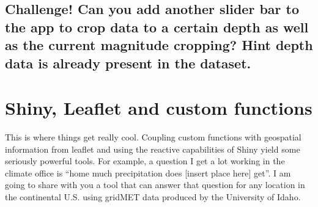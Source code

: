 \documentclass[]{article}
\newenvironment{Shaded}{\begin{snugshade}}{\end{snugshade}}
\newcommand{\DataTypeTok}[1]{\textcolor[rgb]{0.13,0.29,0.53}{#1}}
\newcommand{\FloatTok}[1]{\textcolor[rgb]{0.00,0.00,0.81}{#1}}
\newcommand{\KeywordTok}[1]{\textcolor[rgb]{0.13,0.29,0.53}{\textbf{#1}}}
\newcommand{\NormalTok}[1]{#1}
\newcommand{\OperatorTok}[1]{\textcolor[rgb]{0.81,0.36,0.00}{\textbf{#1}}}
\newcommand{\StringTok}[1]{\textcolor[rgb]{0.31,0.60,0.02}{#1}}
\begin{document}
\begin{Shaded}
\begin{Highlighting}[]
{{{{\StringTok{        }\KeywordTok{addLegend}\NormalTok{(}\DataTypeTok{position=}\StringTok{"bottomleft"}\NormalTok{, }\DataTypeTok{pal=}\NormalTok{pal, }\DataTypeTok{values =} \OperatorTok{~}\NormalTok{mag, }\DataTypeTok{title =} \StringTok{"Magnitude"}\NormalTok{, }\DataTypeTok{opacity =} \FloatTok{0.3}\NormalTok{)}
\NormalTok{  \})}
\NormalTok{\})}
\end{Highlighting}
\end{Shaded}

\hypertarget{challenge-can-you-add-another-slider-bar-to-the-app-to-crop-data-to-a-certain-depth-as-well-as-the-current-magnitude-cropping-hint-depth-data-is-already-present-in-the-dataset.}{%
\subsection{Challenge! Can you add another slider bar to the app to crop
data to a certain depth as well as the current magnitude cropping? Hint
depth data is already present in the
dataset.}\label{challenge-can-you-add-another-slider-bar-to-the-app-to-crop-data-to-a-certain-depth-as-well-as-the-current-magnitude-cropping-hint-depth-data-is-already-present-in-the-dataset.}}

\hypertarget{shiny-leaflet-and-custom-functions}{%
\section{Shiny, Leaflet and custom
functions}\label{shiny-leaflet-and-custom-functions}}

This is where things get really cool. Coupling custom functions with
geospatial information from leaflet and using the reactive capabilities
of Shiny yield some seriously powerful tools. For example, a question I
get a lot working in the climate office is ``home much precipitation
does {[}insert place here{]} get''. I am going to share with you a tool
that can answer that question for any location in the continental U.S.
using gridMET data produced by the University of Idaho.
\end{document}
